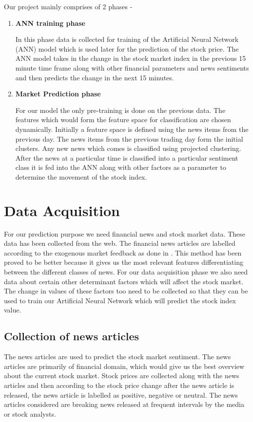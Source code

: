 \documentclass[a4paper,12bp]{report}
\begin{document}
Our project mainly comprises of 2 phases -

\begin{enumerate}
\item \textbf{ANN training phase}

In this phase data is collected for training of the Artificial Neural Network (ANN) model which is used later for the prediction of the stock price. The ANN model takes in the change in the stock market index in the previous 15 minute time frame along with other financial parameters and news sentiments and then predicts the change in the next 15 minutes.

\item \textbf{Market Prediction phase}

For our model the only pre-training is done on the previous data. The features which would form the feature space for classification are chosen dynamically. Initially a feature space is defined using the news items from the previous day. The news items from the previous trading day form the initial clusters. Any new news which comes is classified using projected clustering. After the news at a particular time is classified into a particular sentiment class it is fed into the ANN along with other factors as a parameter to determine the movement of the stock index.
\end{enumerate}

\section{Data Acquisition}
For our prediction purpose we need financial news and stock market data. These data has been collected from the web. The financial news articles are labelled according to the exogenous market feedback as done in \cite{Hagenau:2013}. This method has been proved to be better because it gives us the most relevant features differentiating between the different classes of news. For our data acquisition phase we also need data about certain other determinant factors which will affect the stock market. The change in values of these factors too need to be collected so that they can be used to train our Artificial Neural Network which will predict the stock index value. 

\subsection{Collection of news articles}
The news articles are used to predict the stock market sentiment. The news articles are primarily of financial domain, which would give us the best overview about the current stock market. Stock prices are collected along with the news articles and then according to the stock price change after the news article is released, the news article is labelled as positive, negative or neutral. The news articles considered are breaking news released at frequent intervals by the media or stock analysts. 
\end{document}
